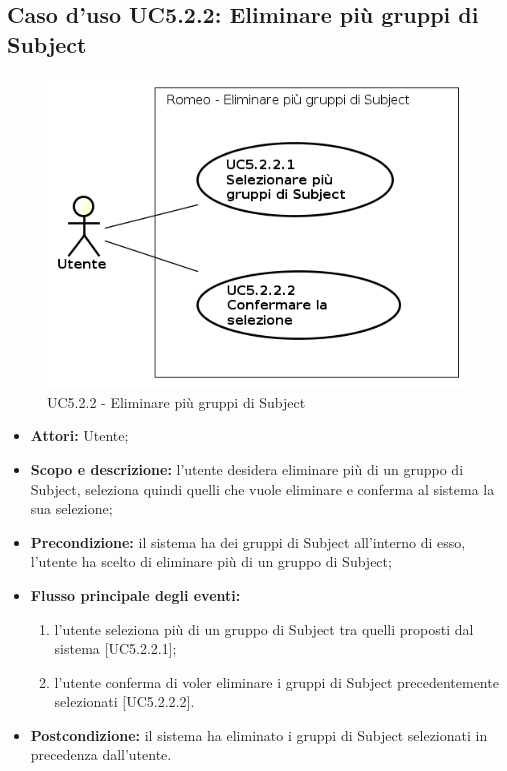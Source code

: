 \subsection{Caso d'uso UC5.2.2: Eliminare più gruppi di Subject}
\begin{figure}[!h]
\begin{center}
\includegraphics[scale=0.6]{./img/Use_Case/UC5_2_2}
\caption{UC5.2.2 - Eliminare più gruppi di Subject}
\end{center}
\end{figure}
\begin{itemize}
\item \textbf{Attori:} Utente;
\item \textbf{Scopo e descrizione:} l'utente desidera eliminare più di un gruppo di Subject\glossario{}, seleziona quindi quelli che vuole eliminare e conferma al sistema la sua selezione; 
\item \textbf{Precondizione:} il sistema ha dei gruppi di Subject\glossario{} all'interno di esso, l'utente ha scelto di eliminare più di un gruppo di Subject\glossario{};
\item \textbf{Flusso principale degli eventi:}
\begin{enumerate}
\item l'utente seleziona più di un gruppo di Subject\glossario{} tra quelli proposti dal sistema [UC5.2.2.1];
\item l'utente conferma di voler eliminare i gruppi di Subject\glossario{} precedentemente selezionati [UC5.2.2.2].
\end{enumerate}
\item \textbf{Postcondizione:} il sistema ha eliminato i gruppi di Subject\glossario{} selezionati in precedenza dall'utente.
\end{itemize}

